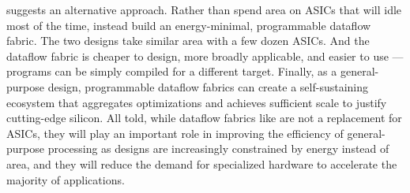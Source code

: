 \riptide suggests an alternative approach.
%
Rather than spend area on ASICs that will idle most of the time,
instead build an energy-minimal, programmable dataflow fabric.
%
The two designs take similar area with a few dozen ASICs.
%
And the dataflow fabric is cheaper to design, more broadly applicable,
and easier to use --- programs can be simply compiled for a
different target.
%
Finally, as a general-purpose design, programmable dataflow fabrics
can create a self-sustaining ecosystem that aggregates optimizations
and achieves sufficient scale to justify cutting-edge silicon.
%
All told, while dataflow fabrics like \riptide are not a replacement
for ASICs, they will play an important role in
improving the efficiency of general-purpose processing
as designs are increasingly constrained by energy instead of area,
and they will reduce the demand for specialized hardware to accelerate
the majority of applications.

